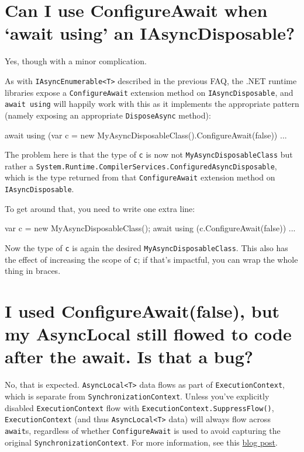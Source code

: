 \documentclass[a4paper,12pt,notitlepage,twoside,openright]{article}
\begin{document}
\hypertarget{can-i-use-configureawait-when-await-using-an-iasyncdisposable}{%
\section{Can I use ConfigureAwait when `await using' an
IAsyncDisposable?}\label{can-i-use-configureawait-when-await-using-an-iasyncdisposable}}

Yes, though with a minor complication.

As with \texttt{IAsyncEnumerable\textless{}T\textgreater{}} described in
the previous FAQ, the .NET runtime libraries expose a
\texttt{ConfigureAwait} extension method on \texttt{IAsyncDisposable},
and \texttt{await\ using} will happily work with this as it implements
the appropriate pattern (namely exposing an appropriate
\texttt{DisposeAsync} method):

\begin{csharpcode}
await using (var c = new MyAsyncDisposableClass().ConfigureAwait(false))
{
    ...
}
\end{csharpcode}

The problem here is that the type of \texttt{c} is now not
\texttt{MyAsyncDisposableClass} but rather a
\texttt{System.Runtime.CompilerServices.ConfiguredAsyncDisposable},
which is the type returned from that \texttt{ConfigureAwait} extension
method on \texttt{IAsyncDisposable}.

To get around that, you need to write one extra line:

\begin{csharpcode}
var c = new MyAsyncDisposableClass();
await using (c.ConfigureAwait(false))
{
    ...
}
\end{csharpcode}

Now the type of \texttt{c} is again the desired
\texttt{MyAsyncDisposableClass}. This also has the effect of increasing
the scope of \texttt{c}; if that's impactful, you can wrap the whole
thing in braces.

\hypertarget{i-used-configureawaitfalse-but-my-asynclocal-still-flowed-to-code-after-the-await.-is-that-a-bug}{%
\section{I used ConfigureAwait(false), but my AsyncLocal still flowed
to code after the await. Is that a
bug?}\label{i-used-configureawaitfalse-but-my-asynclocal-still-flowed-to-code-after-the-await.-is-that-a-bug}}

No, that is expected. \texttt{AsyncLocal\textless{}T\textgreater{}} data
flows as part of \texttt{ExecutionContext}, which is separate from
\texttt{SynchronizationContext}. Unless you've explicitly disabled
\texttt{ExecutionContext} flow with
\texttt{ExecutionContext.SuppressFlow()}, \texttt{ExecutionContext} (and
thus \texttt{AsyncLocal\textless{}T\textgreater{}} data) will always
flow across \texttt{await}s, regardless of whether
\texttt{ConfigureAwait} is used to avoid capturing the original
\texttt{SynchronizationContext}. For more information, see this
\href{https://devblogs.microsoft.com/pfxteam/executioncontext-vs-synchronizationcontext/}{blog
post}.
\end{document}
